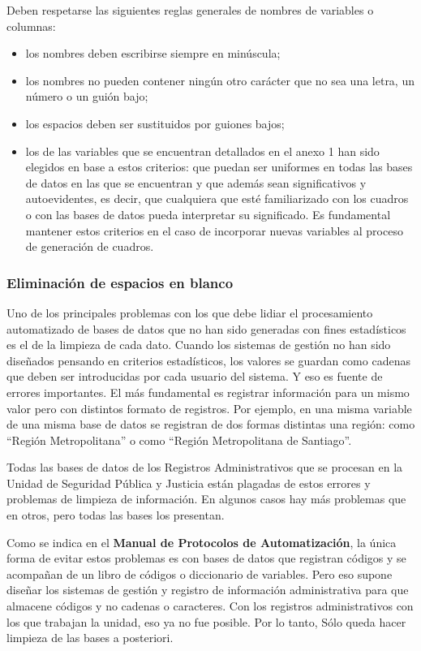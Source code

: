 \documentclass[
  spanish,
]{book}
\begin{document}
Deben respetarse las siguientes reglas generales de nombres de variables o columnas:

\begin{itemize}
\item
  los nombres deben escribirse siempre en minúscula;
\item
  los nombres no pueden contener ningún otro carácter que no sea una letra, un número o un guión bajo;
\item
  los espacios deben ser sustituidos por guiones bajos;
\item
  los de las variables que se encuentran detallados en el anexo 1 han sido elegidos en base a estos criterios: que puedan ser uniformes en todas las bases de datos en las que se encuentran y que además sean significativos y autoevidentes, es decir, que cualquiera que esté familiarizado con los cuadros o con las bases de datos pueda interpretar su significado. Es fundamental mantener estos criterios en el caso de incorporar nuevas variables al proceso de generación de cuadros.
\end{itemize}

\hypertarget{eliminaciuxf3n-de-espacios-en-blanco}{%
\subsubsection{Eliminación de espacios en blanco}\label{eliminaciuxf3n-de-espacios-en-blanco}}

Uno de los principales problemas con los que debe lidiar el procesamiento automatizado de bases de datos que no han sido generadas con fines estadísticos es el de la limpieza de cada dato. Cuando los sistemas de gestión no han sido diseñados pensando en criterios estadísticos, los valores se guardan como cadenas que deben ser introducidas por cada usuario del sistema. Y eso es fuente de errores importantes. El más fundamental es registrar información para un mismo valor pero con distintos formato de registros. Por ejemplo, en una misma variable de una misma base de datos se registran de dos formas distintas una región: como ``Región Metropolitana'' o como ``Región Metropolitana de Santiago''.

Todas las bases de datos de los Registros Administrativos que se procesan en la Unidad de Seguridad Pública y Justicia están plagadas de estos errores y problemas de limpieza de información. En algunos casos hay más problemas que en otros, pero todas las bases los presentan.

Como se indica en el \textbf{Manual de Protocolos de Automatización}, la única forma de evitar estos problemas es con bases de datos que registran códigos y se acompañan de un libro de códigos o diccionario de variables. Pero eso supone diseñar los sistemas de gestión y registro de información administrativa para que almacene códigos y no cadenas o caracteres. Con los registros administrativos con los que trabajan la unidad, eso ya no fue posible. Por lo tanto, Sólo queda hacer limpieza de las bases a posteriori.
\end{document}
